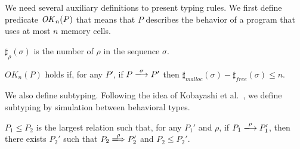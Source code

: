 
We need several auxiliary definitions to present typing rules.  We
first define predicate \(\mathit{OK}_n(P)\) that means that \(P\) describes
the behavior of a program that uses at most \(n\) memory cells.

\begin{myDef}[\(\sharp_{\rho}(\sigma)\)]
 \label{df:sharf}
\(\sharp_{\rho}(\sigma)\) is the number of \(\rho\) in the sequence
\(\sigma\).
\end{myDef}


\begin{myDef}
\label{df:okn}
\(OK_{n}(P)\) holds if, for any \(P'\), if \(P
\xlongrightarrow{\sigma}P'\) then
\(\sharp_{malloc}(\sigma)-\sharp_{free}(\sigma)\le n\).
\end{myDef}

We also define subtyping.  Following the idea of Kobayashi et
al.~\cite{DBLP:journals/tcs/IgarashiK04}, we define subtyping by
simulation between behavioral types.

 \begin{myDef}[Subtyping]

\(P_1 \le P_2\) is the largest relation such that, for any \(P_1'\)
and \(\rho\), if \(P_1 \xlongrightarrow{\rho} P_1'\), then there
exists \(P_2'\) such that \(P_2 \xLongrightarrow{\rho} P_2'\) and
\(P_2 \le P_2'\).

\label{df:subtype}
\end{myDef}

